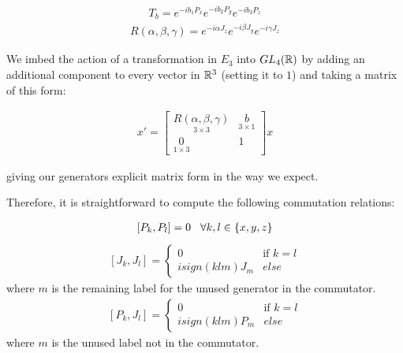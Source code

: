 \begin{equation}
\begin{aligned}
	T_b = e^{-ib_1P_x}e^{-ib_2P_y}e^{-ib_3P_z}
\end{aligned}
\end{equation}
\begin{equation}
\begin{aligned}
	R(\alpha,\beta,\gamma) = e^{-i\alpha J_z}e^{-i\beta J_y}e^{-i\gamma J_z}
\end{aligned}
\end{equation}	

We imbed the action of a transformation in $E_3$ into $GL_4(\mathbb{R})$ by adding an additional component to every vector in $\mathbb{R}^3$ (setting it to $1$) and taking a matrix of this form:

\begin{equation}
\begin{aligned}
	x' =
	\begin{bmatrix}
		\underset{3\times 3}{R(\alpha,\beta,\gamma)} & \underset{3\times 1}{b}\\
		\underset{1\times 3}{0} & 1
	\end{bmatrix} x
\end{aligned}
\end{equation}

giving our generators explicit matrix form in the way we expect.

Therefore, it is straightforward to compute the following commutation relations:

\begin{equation}
\begin{aligned}
	[P_k,P_l] = 0 \hspace{3mm} \forall k,l\in \{x,y,z\}
\end{aligned}
\end{equation}
\begin{equation}
\begin{aligned}
	[J_k,J_l] = \begin{cases}
					0 & \text{if } k = l\\
					isign(klm)J_m & else
					\end{cases}
\end{aligned}
\end{equation}
where $m$ is the remaining label for the unused generator in the commutator.
\begin{equation}
\begin{aligned}
	[P_k,J_l] = \begin{cases}
					0 & \text{if } k = l\\
					isign(klm)P_m & else \end{cases}
\end{aligned}
\end{equation}
where $m$ is the unused label not in the commutator.

